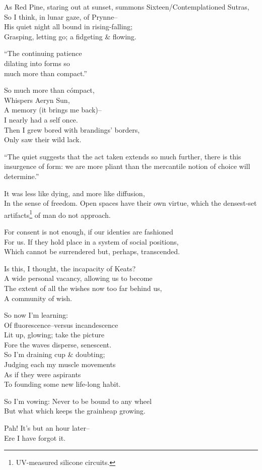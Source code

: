 
As Red Pine, staring out at sunset, summons Sixteen\-/Contemplationed Sutras, \\
So I think, in lunar gaze, of Prynne-- \\
His quiet night all bound in rising-falling; \\
Grasping, letting go; a fidgeting \& flowing.

``The continuing patience \\
dilating into forms so \\
much more than compact.'' 

So much more than cómpact, \\
Whispers Aeryn Sun, \\
A memory (it brings me back)-- \\
I nearly had a self once. \\
Then I grew bored with brandings' borders, \\
Only saw their wild lack.

``The quiet
suggests that the act taken
extends so much further, there
is this insurgence of form:
we are more pliant than the mercantile notion 
of choice will determine.''

It was less like dying, and more like diffusion, \\
In the sense of freedom. Open spaces have their own virtue, which the densest-set artifacts\footnote{UV-measured silicone circuits.} of man do not approach.

For consent is not enough, if our identies are fashioned \\
For us. If they hold place in a system of social positions, \\
Which cannot be surrendered but, perhaps, transcended.

Is this, I thought, the incapacity of Keats? \\
A wide personal vacancy, allowing us to become \\
The extent of all the wishes now too far behind us, \\
A community of wish.

So now I'm learning: \\
Of fluorescence--versus incandescence \\
Lit up, glowing; take the picture \\
Fore the waves disperse, senescent. \\
So I'm draining cup \& doubting; \\
Judging each my muscle movements \\
As if they were aspirants \\
To founding some new life-long habit.

So I'm vowing: Never to be bound to any wheel \\
But what which keeps the grainheap growing.

\secdiv

Pah! It's but an hour later-- \\
Ere I have forgot it.